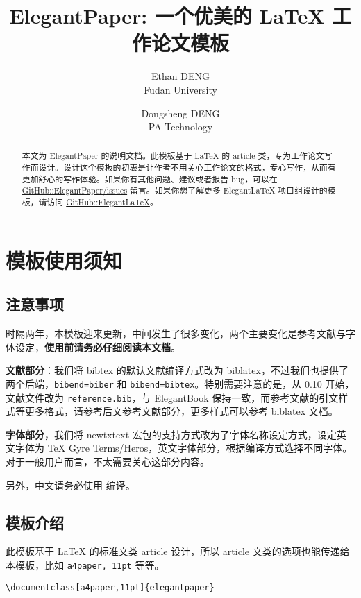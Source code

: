 \documentclass[lang=cn,a4paper]{elegantpaper}
\title{ElegantPaper: 一个优美的 \LaTeX{} 工作论文模板}
\author{Ethan DENG \\ Fudan University \and Dongsheng DENG \\ PA Technology}
\institute{\href{https://elegantlatex.org/}{Elegant\LaTeX{} 项目组}}
\date{\zhtoday}
\begin{document}
\maketitle

\begin{abstract}
本文为 \href{https://github.com/ElegantLaTeX/ElegantPaper/}{ElegantPaper} 的说明文档。此模板基于 \LaTeX{} 的 article 类，专为工作论文写作而设计。设计这个模板的初衷是让作者不用关心工作论文的格式，专心写作，从而有更加舒心的写作体验。如果你有其他问题、建议或者报告 bug，可以在 \href{https://github.com/ElegantLaTeX/ElegantPaper/issues}{GitHub::ElegantPaper/issues} 留言。如果你想了解更多 Elegant\LaTeX{} 项目组设计的模板，请访问 \href{https://github.com/ElegantLaTeX/}{GitHub::ElegantLaTeX}。
\end{abstract}

\section{模板使用须知}

\subsection{注意事项}

时隔两年，本模板迎来更新，中间发生了很多变化，两个主要变化是参考文献与字体设定，\textbf{使用前请务必仔细阅读本文档}。

\textbf{文献部分}：我们将 bibtex 的默认文献编译方式改为 biblatex，不过我们也提供了两个后端，\lstinline{bibend=biber} 和 \lstinline{bibend=bibtex}。特别需要注意的是，从 0.10 开始，文献文件改为 \lstinline{reference.bib}，与 ElegantBook 保持一致，而参考文献的引文样式等更多格式，请参考后文参考文献部分，更多样式可以参考 biblatex 文档。 

\textbf{字体部分}，我们将 newtxtext 宏包的支持方式改为了字体名称设定方式，设定英文字体为 TeX Gyre Terms/Heros，英文字体部分，根据编译方式选择不同字体。对于一般用户而言，不太需要关心这部分内容。

另外，中文请务必使用  编译。

\subsection{模板介绍}

此模板基于 \LaTeX{} 的标准文类 article 设计，所以 article 文类的选项也能传递给本模板，比如 \lstinline{a4paper, 11pt} 等等。

\begin{lstlisting}
\documentclass[a4paper,11pt]{elegantpaper}
\end{lstlisting}
\end{document}
